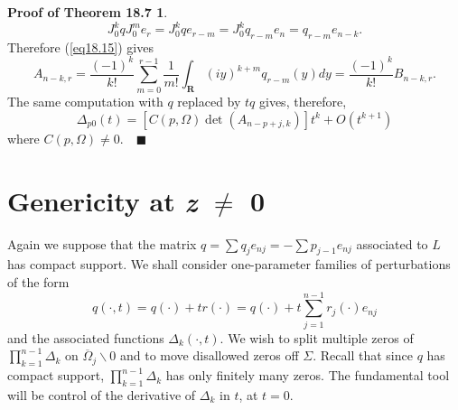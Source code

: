 \documentclass{surv-l}
\theoremstyle{plain}
\theoremstyle{definition}
\newtheorem*{pot}{\sc Proof of Theorem 18.7}
\numberwithin{equation}{chapter}
\begin{document}
\begin{pot}
\begin{equation*}
J_{0}^{k}qJ_{0}^{m}e_{r}=J_{0}^{k}qe_{r-m}=J_{0}^{k}q_{r-m}e_{n}=q_{r-m}e_{n-k}.
\end{equation*}
Therefore (\ref{eq18.15}) gives
\begin{equation*}
A_{n-k,r}=\frac{(-1)^{k}}{k!}\sum_{m=0}^{r-1}\frac{1}{m!}\int_{\mathbf{R}}(iy)^{k+m}q_{r-m}(y)dy=\frac{(-1)^{k}}{k!}B_{n-k,r}.
\end{equation*}
The same computation with $q$ replaced by $tq$ gives, therefore,
\begin{equation*}
\Delta_{p 0}(t)=[C(p,\Omega)\det(A_{n-p+j,k})]t^{k}+O(t^{k+1})
\end{equation*}
where $C(p, \Omega)\neq 0.\quad \blacksquare$
\end{pot}

\section{Genericity at \emph{z} $\mathbf{\neq}$ 0}\label{sec19}
Again we suppose that the matrix $q= \sum q_{j}e_{nj}= -\sum p_{j-1}e_{nj}$ associated to $L$ has compact support. We shall consider one-parameter families of perturbations of the form
\setcounter{equation}{0}
\begin{equation}\label{eq19.1}
q(\cdot, t)=q(\cdot)+tr(\cdot)=q(\cdot)+t\sum_{j=1}^{n-1}r_{j}(\cdot)e_{nj}
\end{equation}
and the associated functions $\Delta_{k}(\cdot, t)$. We wish to split multiple zeros of $\prod_{k=1}^{n-1}\Delta_{k}$ on $\overline{\Omega}_{j}\backslash 0$ and to move disallowed zeros off $\Sigma$. Recall that since $q$ has compact support, $\prod_{k=1}^{n-1}\Delta_{k}$ has only finitely many zeros. The fundamental tool will be control of the derivative of $\Delta_{k}$ in $t$, at $t=0$.
\end{document}
